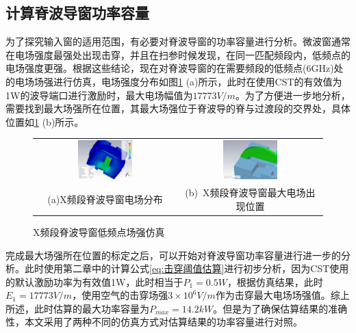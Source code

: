\documentclass[master]{thesis-uestc}
\begin{document}
\subsection{计算脊波导窗功率容量}
为了探究输入窗的适用范围，有必要对脊波导窗的功率容量进行分析。微波窗通常在电场强度最强处出现击穿，并且在扫参时候发现，在同一匹配频段内，低频点的电场强度更强。根据这些结论，现在对脊波导窗的在需要频段的低频点(6GHz)处的电场场强进行仿真，电场强度分布如图\ref{fig:X频段脊波导窗低频点场强仿真} (a)所示，此时在使用CST的有效值为1W的波导端口进行激励时，最大电场幅值为\(17773V/m\)。为了方便进一步地分析，需要找到最大场强所在位置，其最大场强位于脊波导的脊与过渡段的交界处，具体位置如\ref{fig:X频段脊波导窗低频点场强仿真} (b)所示。
\begin{figure}[!htb]
    \small
    \centering
    \begin{tabular}{@{\ }c@{\ }c}
        \includegraphics[width=0.4\textwidth]{pic/chapter3/X频段等效1W最大场强.png} & 
        \hspace{5pt}
        \includegraphics[width=0.4\textwidth]{pic/chapter3/X频段最大场强出现位置.png}     \\
        \mbox{\small (a)X频段脊波导窗电场分布}                                                                               & 
        \mbox{\small (b) X频段脊波导窗最大电场出现位置}                                                                                  \\
    \end{tabular}
    \caption{X频段脊波导窗低频点场强仿真}
    \label{fig:X频段脊波导窗低频点场强仿真}
\end{figure}

完成最大场强所在位置的标定之后，可以开始对脊波导窗功率容量进行进一步的分析。此时使用第二章中的计算公式\ref{eq:击穿阈值估算}进行初步分析，因为CST使用的默认激励功率为有效值1W，此时相当于\(P_{1}=0.5W\)，根据仿真结果，此时\(E_1 = 17773V/m\)，使用空气的击穿场强\(3 \times 10^6V/m\)作为击穿最大电场场强值。综上所述，此时估算的最大功率容量为\(P_{max}=14.2kW\)。但是为了确保估算结果的准确性，本文采用了两种不同的仿真方式对估算结果的功率容量进行对照。
\end{document}
